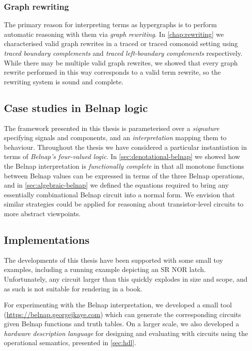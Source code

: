 \subsubsection{Graph rewriting}

The primary reason for interpreting terms as hypergraphs is to perform automatic
reasoning with them via \emph{graph rewriting}.
In \cref{chap:rewriting} we characterised valid graph rewrites in a traced or
traced comonoid setting using \emph{traced boundary complements} and
\emph{traced left-boundary complements} respectively.
While there may be multiple valid graph rewrites, we showed that every graph
rewrite performed in this way corresponds to a valid term rewrite, so the
rewriting system is sound and complete.

\subsection{Case studies in Belnap logic}

The framework presented in this thesis is parameterised over a
\emph{signature} specifying signals and components, and an
\emph{interpretation} mapping them to behaviour.
Throughout the thesis we have considered a particular instantiation in terms of
\emph{Belnap's four-valued logic}.
In \cref{sec:denotational-belnap} we showed how the Belnap interpretation is
\emph{functionally complete} in that all monotone functions between Belnap
values can be expressed in terms of the three Belnap operations, and in
\cref{sec:algebraic-belnap} we defined the equations required to bring any
essentially combinational Belnap circuit into a normal form.
We envision that similar strategies could be applied for reasoning
about transistor-level circuits to more abstract viewpoints.

\subsection{Implementations}

The developments of this thesis have been supported with some small toy
examples, including a running example depicting an SR NOR latch.
Unfortunately, any circuit larger than this quickly explodes in size and scope,
and as such is not suitable for rendering in a book.

For experimenting with the Belnap interpretation, we developed a small tool
(\url{https://belnap.georgejkaye.com}) which can generate the
corresponding circuits given Belnap functions and truth tables.
On a larger scale, we also developed a \emph{hardware description language} for
designing and evaluating with circuits using the operational semantics,
presented in \cref{sec:hdl}.

